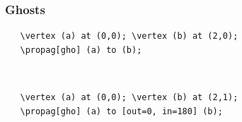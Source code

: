 \documentclass[10pt,letterpaper,twoside,notitlepage]{article}
\numberwithin{figure}{section}
\begin{document}
\subsubsection*{Ghosts}
%
\begin{minipage}{0.7\linewidth}
\vercol\begin{verbatim}
   \vertex (a) at (0,0); \vertex (b) at (2,0);
   \propag[gho] (a) to (b);
\end{verbatim}\txcol
\end{minipage}
%
\begin{minipage}{0.25\linewidth}
\end{minipage}
\\
%
\begin{minipage}{0.7\linewidth}
\vercol\begin{verbatim}
   \vertex (a) at (0,0); \vertex (b) at (2,1);
   \propag[gho] (a) to [out=0, in=180] (b);
\end{verbatim}\txcol
\end{minipage}
%
\begin{minipage}{0.25\linewidth}
\end{minipage}
%
\end{document}
